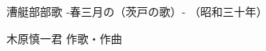 \documentclass[10pt,b5j]{tarticle} %
\begin{document}
\begin{minipage}[c]{0.7\hsize} %
    \begin{center}
        {\LARGE
            漕艇部部歌 %
        }
        {\large 
            ‐春三月の（茨戸の歌）‐
        }
        {\small 
            （昭和三十年） %
        }
    \end{center}
\end{minipage}
\begin{minipage}[c]{0.3\hsize} %
    \begin{flushright} %
        木原慎一君 作歌・作曲 %
    \end{flushright}
\end{minipage}
\end{document}
